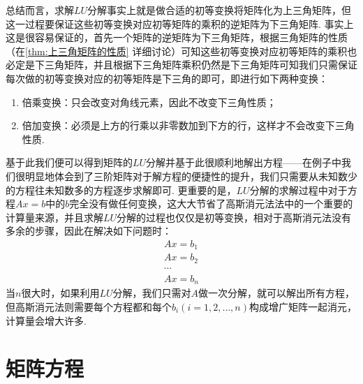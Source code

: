 总结而言，求解$LU$分解事实上就是做合适的初等变换将矩阵化为上三角矩阵，但这一过程要保证这些初等变换对应初等矩阵的乘积的逆矩阵为下三角矩阵. 事实上这是很容易保证的，首先一个矩阵的逆矩阵为下三角矩阵，根据三角矩阵的性质（在\autoref{thm:上三角矩阵的性质} 详细讨论）可知这些初等变换对应初等矩阵的乘积也必定是下三角矩阵，并且根据下三角矩阵乘积仍然是下三角矩阵可知我们只需保证每次做的初等变换对应的初等矩阵是下三角的即可，即进行如下两种变换：
\begin{enumerate}
    \item 倍乘变换：只会改变对角线元素，因此不改变下三角性质；
    \item 倍加变换：必须是上方的行乘以非零数加到下方的行，这样才不会改变下三角性质.
\end{enumerate}
基于此我们便可以得到矩阵的$LU$分解并基于此很顺利地解出方程——在例子中我们很明显地体会到了三阶矩阵对于解方程的便捷性的提升，我们只需要从未知数少的方程往未知数多的方程逐步求解即可. 更重要的是，$LU$分解的求解过程中对于方程$Ax=b$中的$b$完全没有做任何变换，这大大节省了高斯消元法法中的一个重要的计算量来源，并且求解$LU$分解的过程也仅仅是初等变换，相对于高斯消元法没有多余的步骤，因此在解决如下问题时：
\begin{gather*}
    Ax=b_1 \\ Ax=b_2 \\ \cdots \\ Ax=b_n
\end{gather*}
当$n$很大时，如果利用$LU$分解，我们只需对$A$做一次分解，就可以解出所有方程，但高斯消元法则需要每个方程都和每个$b_i(i=1,2,\ldots,n)$构成增广矩阵一起消元，计算量会增大许多.

\section{矩阵方程}

